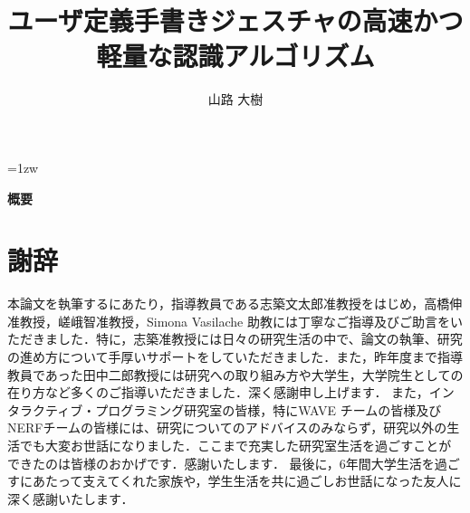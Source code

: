 \documentclass[a4paper,11pt]{jreport}
\title{ユーザ定義手書きジェスチャの高速かつ軽量な認識アルゴリズム}
\author{山路 大樹}
\begin{document}
\maketitle
\thispagestyle{empty}
\newpage

\thispagestyle{empty}
\vspace*{20pt plus 1fil}
\parindent=1zw
\noindent
\begin{center}
{\bf 概要}
\vspace{5mm}
\end{center}



\par
\vspace{0pt plus 1fil}
\newpage

\tableofcontents
\listoffigures

\pagebreak \setcounter{page}{1}





















\chapter*{謝辞}
本論文を執筆するにあたり，指導教員である志築文太郎准教授をはじめ，高橋伸准教授，嵯峨智准教授，Simona Vasilache 助教には丁寧なご指導及びご助言をいただきました．特に，志築准教授には日々の研究生活の中で、論文の執筆、研究の進め方について手厚いサポートをしていただきました．また，昨年度まで指導教員であった田中二郎教授には研究への取り組み方や大学生，大学院生としての在り方など多くのご指導いただきました．深く感謝申し上げます．
また，インタラクティブ・プログラミング研究室の皆様，特にWAVE チームの皆様及びNERFチームの皆様には、研究についてのアドバイスのみならず，研究以外の生活でも大変お世話になりました．ここまで充実した研究室生活を過ごすことができたのは皆様のおかげです．感謝いたします．
最後に，6年間大学生活を過ごすにあたって支えてくれた家族や，学生生活を共に過ごしお世話になった友人に深く感謝いたします．

\newpage

\renewcommand{\bibname}{参考文献}




\appendix



\end{document}
